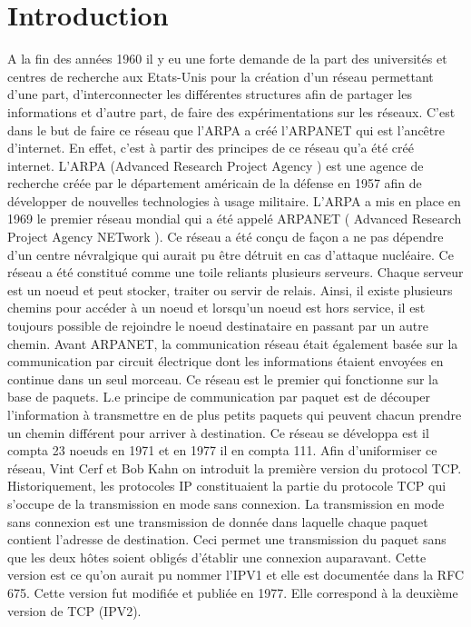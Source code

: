 \documentclass[twoside,openright,a4paper,11pt,french]{article}
\begin{document}
\pagestyle{plain}




\parskip=0pt
\tableofcontents


\section{Introduction}
\label{sec:intro}


A la fin des années 1960 il y eu une forte demande de la part des universités et centres de recherche aux Etats-Unis pour la création d'un réseau permettant d'une part, d'interconnecter les différentes structures afin de partager les informations et d'autre part, de faire des expérimentations sur les réseaux. 
C'est dans le but de faire ce réseau que l'ARPA a créé l'ARPANET qui est l'ancêtre d'internet. En effet, c'est à partir des principes de ce réseau qu'a été créé internet. L'ARPA (Advanced Research Project Agency ) est une agence de recherche créée par le département américain de la défense en 1957 afin de développer de nouvelles technologies à usage militaire. L'ARPA a mis en place en 1969 le premier réseau mondial qui a été appelé ARPANET ( Advanced Research Project Agency NETwork ). Ce réseau a été conçu de façon a ne pas dépendre d'un centre névralgique qui aurait pu être détruit en cas d'attaque nucléaire. Ce réseau a été constitué comme une toile reliants plusieurs serveurs. Chaque serveur est un noeud et peut stocker, traiter ou servir de relais. Ainsi, il existe plusieurs chemins pour accéder à un noeud et lorsqu'un noeud est hors service, il est toujours possible de rejoindre le noeud destinataire en passant par un autre chemin. Avant ARPANET, la communication réseau était également basée sur la communication par circuit électrique dont les  informations étaient envoyées en continue dans un seul morceau. Ce réseau est  le premier qui fonctionne sur la base de paquets. L.e principe de communication par paquet est de découper l'information à transmettre en de plus petits paquets qui peuvent chacun prendre un chemin différent pour arriver à destination.
Ce réseau se développa est il compta 23 noeuds en 1971 et en 1977 il en compta 111. Afin d'uniformiser ce réseau, Vint Cerf et Bob Kahn on introduit la première version du protocol TCP.
Historiquement, les protocoles IP constituaient la partie du protocole TCP qui s'occupe de la transmission en mode sans connexion. La transmission en mode sans connexion est une transmission de donnée dans laquelle chaque paquet contient l'adresse de destination. Ceci permet une transmission  du paquet sans que les deux hôtes soient obligés d'établir une connexion auparavant. Cette version est ce qu'on aurait pu nommer l'IPV1 et elle est documentée dans la RFC 675. Cette version fut modifiée et publiée en 1977. Elle correspond à la deuxième version de TCP (IPV2).
\end{document}
